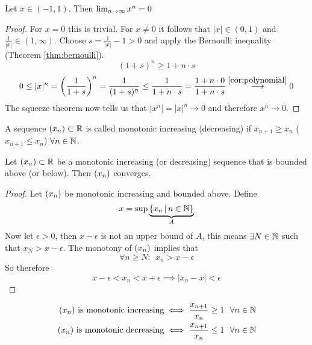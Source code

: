 \documentclass[../../script.tex]{subfiles}
\begin{document}
\begin{eg}
Let $x \in (-1, 1)$. Then $\lim_{n \rightarrow \infty} x^n = 0$
\end{eg}
\begin{proof}
For $x = 0$ this is trivial. For $x \ne 0$ it follows that $|x| \in (0, 1)$ and $\frac{1}{|x|} \in (1, \infty)$. Choose $s = \frac{1}{|x|} - 1 > 0$ and apply the Bernoulli inequality (Theorem \autoref{thm:bernoulli}).
\begin{equation}
	(1 + s)^n \ge 1 + n \cdot s
\end{equation}
\begin{equation}
	0 \le |x|^n = \left(\frac{1}{1+s}\right)^n = \frac{1}{(1+s)^n} \le \frac{1}{1 + n\cdot s} = \frac{1 + n \cdot 0}{1 + n \cdot s} \stackrel{\autoref{cor:polynomial}}{\longrightarrow} 0
\end{equation}
The squeeze theorem now tells us that $|x^n| = |x|^n \rightarrow 0$ and therefore $x^n \rightarrow 0$.
\end{proof}

\begin{defi}
A sequence $(x_n) \subset \mathbb{R}$ is called monotonic increasing (decreasing) if $x_{n+1} \ge x_n$ ($x_{n+1} \le x_n$) $\forall n \in \mathbb{N}$.
\end{defi}

\begin{thm}\label{thm:monotone}
Let $(x_n) \subset \mathbb{R}$ be a monotonic increasing (or decreasing) sequence that is bounded above (or below). Then $(x_n)$ converges.
\end{thm}
\begin{proof}
Let $(x_n)$ be monotonic increasing and bounded above. Define
\begin{equation}
	x = \sup \underbrace{\{x_n \,\vert\, n \in \mathbb{N} \}}_A
\end{equation}
Now let $\epsilon > 0$, then $x - \epsilon$ is not an upper bound of $A$, this means $\exists N \in \mathbb{N}$ such that $x_N > x - \epsilon$. The monotony of $(x_n)$ implies that
\begin{equation}
	\forall n \ge N: ~~x_n > x - \epsilon
\end{equation}
So therefore
\begin{equation}
	x - \epsilon < x_n < x + \epsilon \implies |x_n - x| < \epsilon
\end{equation}
\end{proof}

\begin{rem}
\begin{align*}
	(x_n) \text{ is monotonic increasing} &\iff \frac{x_{n+1}}{x_n} \ge 1 ~~\forall n \in \mathbb{N} \\
	(x_n) \text{ is monotonic decreasing} &\iff \frac{x_{n+1}}{x_n} \le 1 ~~\forall n \in \mathbb{N}
\end{align*}
\end{rem}
\end{document}
